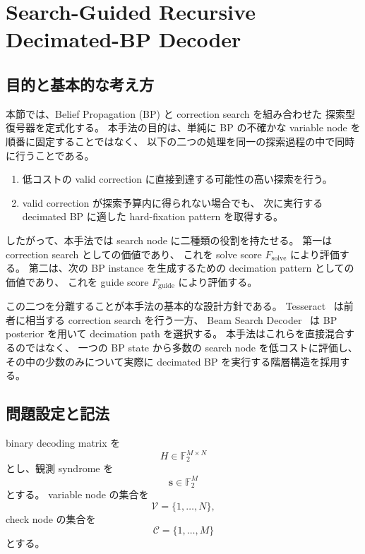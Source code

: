 \section{Search-Guided Recursive Decimated-BP Decoder}
\label{sec:search_guided_recursive_bp}

\subsection{目的と基本的な考え方}

本節では、Belief Propagation (BP) と correction search を組み合わせた
探索型復号器を定式化する。
本手法の目的は、単純に BP の不確かな variable node を順番に固定することではなく、
以下の二つの処理を同一の探索過程の中で同時に行うことである。

\begin{enumerate}
    \item 低コストの valid correction に直接到達する可能性の高い探索を行う。
    \item valid correction が探索予算内に得られない場合でも、
    次に実行する decimated BP に適した hard-fixation pattern を取得する。
\end{enumerate}

したがって、本手法では search node に二種類の役割を持たせる。
第一は correction search としての価値であり、
これを solve score $F_{\mathrm{solve}}$ により評価する。
第二は、次の BP instance を生成するための decimation pattern としての価値であり、
これを guide score $F_{\mathrm{guide}}$ により評価する。

この二つを分離することが本手法の基本的な設計方針である。
Tesseract~\cite{tesseract} は前者に相当する correction search を行う一方、
Beam Search Decoder~\cite{beamsearch} は BP posterior を用いて
decimation path を選択する。
本手法はこれらを直接混合するのではなく、
一つの BP state から多数の search node を低コストに評価し、
その中の少数のみについて実際に decimated BP を実行する階層構造を採用する。


\subsection{問題設定と記法}

binary decoding matrix を
\begin{equation}
    H \in \mathbb{F}_2^{M\times N}
\end{equation}
とし、観測 syndrome を
\begin{equation}
    \bm{s}\in\mathbb{F}_2^M
\end{equation}
とする。
variable node の集合を
\begin{equation}
    \mathcal{V}=\{1,\ldots,N\},
\end{equation}
check node の集合を
\begin{equation}
    \mathcal{C}=\{1,\ldots,M\}
\end{equation}
とする。


